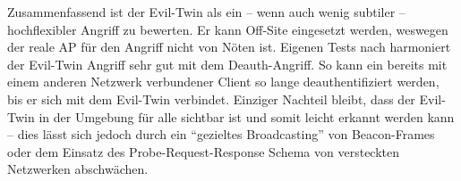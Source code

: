 Zusammenfassend ist der Evil-Twin als ein -- wenn auch wenig subtiler -- hochflexibler Angriff zu bewerten. Er kann Off-Site eingesetzt werden, weswegen der reale AP für den Angriff nicht von Nöten ist.
Eigenen Tests nach harmoniert der Evil-Twin Angriff sehr gut mit dem Deauth-Angriff.
So kann ein bereits mit einem anderen Netzwerk verbundener Client so lange deauthentifiziert werden, bis er sich mit dem Evil-Twin verbindet.
Einziger Nachteil bleibt, dass der Evil-Twin in der Umgebung für alle sichtbar ist und somit leicht erkannt werden kann -- dies lässt sich jedoch durch ein \enquote{gezieltes Broadcasting} von Beacon-Frames oder dem Einsatz des Probe-Request-Response Schema von versteckten Netzwerken abschwächen.
